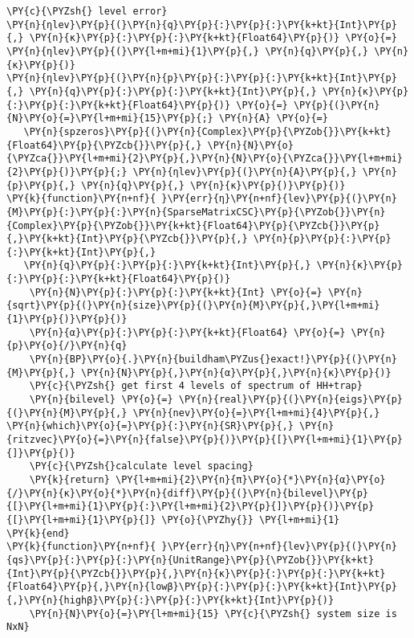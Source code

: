\begin{Verbatim}[commandchars=\\\{\}]
\PY{c}{\PYZsh{} level error}
\PY{n}{ηlev}\PY{p}{(}\PY{n}{q}\PY{p}{:}\PY{p}{:}\PY{k+kt}{Int}\PY{p}{,} \PY{n}{κ}\PY{p}{:}\PY{p}{:}\PY{k+kt}{Float64}\PY{p}{)} \PY{o}{=} \PY{n}{ηlev}\PY{p}{(}\PY{l+m+mi}{1}\PY{p}{,} \PY{n}{q}\PY{p}{,} \PY{n}{κ}\PY{p}{)}
\PY{n}{ηlev}\PY{p}{(}\PY{n}{p}\PY{p}{:}\PY{p}{:}\PY{k+kt}{Int}\PY{p}{,} \PY{n}{q}\PY{p}{:}\PY{p}{:}\PY{k+kt}{Int}\PY{p}{,} \PY{n}{κ}\PY{p}{:}\PY{p}{:}\PY{k+kt}{Float64}\PY{p}{)} \PY{o}{=} \PY{p}{(}\PY{n}{N}\PY{o}{=}\PY{l+m+mi}{15}\PY{p}{;} \PY{n}{A} \PY{o}{=}
   \PY{n}{spzeros}\PY{p}{(}\PY{n}{Complex}\PY{p}{\PYZob{}}\PY{k+kt}{Float64}\PY{p}{\PYZcb{}}\PY{p}{,} \PY{n}{N}\PY{o}{\PYZca{}}\PY{l+m+mi}{2}\PY{p}{,}\PY{n}{N}\PY{o}{\PYZca{}}\PY{l+m+mi}{2}\PY{p}{)}\PY{p}{;} \PY{n}{ηlev}\PY{p}{(}\PY{n}{A}\PY{p}{,} \PY{n}{p}\PY{p}{,} \PY{n}{q}\PY{p}{,} \PY{n}{κ}\PY{p}{)}\PY{p}{)}
\PY{k}{function}\PY{n+nf}{ }\PY{err}{η}\PY{n+nf}{lev}\PY{p}{(}\PY{n}{M}\PY{p}{:}\PY{p}{:}\PY{n}{SparseMatrixCSC}\PY{p}{\PYZob{}}\PY{n}{Complex}\PY{p}{\PYZob{}}\PY{k+kt}{Float64}\PY{p}{\PYZcb{}}\PY{p}{,}\PY{k+kt}{Int}\PY{p}{\PYZcb{}}\PY{p}{,} \PY{n}{p}\PY{p}{:}\PY{p}{:}\PY{k+kt}{Int}\PY{p}{,}
   \PY{n}{q}\PY{p}{:}\PY{p}{:}\PY{k+kt}{Int}\PY{p}{,} \PY{n}{κ}\PY{p}{:}\PY{p}{:}\PY{k+kt}{Float64}\PY{p}{)}
    \PY{n}{N}\PY{p}{:}\PY{p}{:}\PY{k+kt}{Int} \PY{o}{=} \PY{n}{sqrt}\PY{p}{(}\PY{n}{size}\PY{p}{(}\PY{n}{M}\PY{p}{,}\PY{l+m+mi}{1}\PY{p}{)}\PY{p}{)}
    \PY{n}{α}\PY{p}{:}\PY{p}{:}\PY{k+kt}{Float64} \PY{o}{=} \PY{n}{p}\PY{o}{/}\PY{n}{q}
    \PY{n}{BP}\PY{o}{.}\PY{n}{buildham\PYZus{}exact!}\PY{p}{(}\PY{n}{M}\PY{p}{,} \PY{n}{N}\PY{p}{,}\PY{n}{α}\PY{p}{,}\PY{n}{κ}\PY{p}{)}
    \PY{c}{\PYZsh{} get first 4 levels of spectrum of HH+trap}
    \PY{n}{bilevel} \PY{o}{=} \PY{n}{real}\PY{p}{(}\PY{n}{eigs}\PY{p}{(}\PY{n}{M}\PY{p}{,} \PY{n}{nev}\PY{o}{=}\PY{l+m+mi}{4}\PY{p}{,} \PY{n}{which}\PY{o}{=}\PY{p}{:}\PY{n}{SR}\PY{p}{,} \PY{n}{ritzvec}\PY{o}{=}\PY{n}{false}\PY{p}{)}\PY{p}{[}\PY{l+m+mi}{1}\PY{p}{]}\PY{p}{)}
    \PY{c}{\PYZsh{}calculate level spacing}
    \PY{k}{return} \PY{l+m+mi}{2}\PY{n}{π}\PY{o}{*}\PY{n}{α}\PY{o}{/}\PY{n}{κ}\PY{o}{*}\PY{n}{diff}\PY{p}{(}\PY{n}{bilevel}\PY{p}{[}\PY{l+m+mi}{1}\PY{p}{:}\PY{l+m+mi}{2}\PY{p}{]}\PY{p}{)}\PY{p}{[}\PY{l+m+mi}{1}\PY{p}{]} \PY{o}{\PYZhy{}} \PY{l+m+mi}{1}
\PY{k}{end}
\PY{k}{function}\PY{n+nf}{ }\PY{err}{η}\PY{n+nf}{lev}\PY{p}{(}\PY{n}{qs}\PY{p}{:}\PY{p}{:}\PY{n}{UnitRange}\PY{p}{\PYZob{}}\PY{k+kt}{Int}\PY{p}{\PYZcb{}}\PY{p}{,}\PY{n}{κ}\PY{p}{:}\PY{p}{:}\PY{k+kt}{Float64}\PY{p}{,}\PY{n}{lowβ}\PY{p}{:}\PY{p}{:}\PY{k+kt}{Int}\PY{p}{,}\PY{n}{highβ}\PY{p}{:}\PY{p}{:}\PY{k+kt}{Int}\PY{p}{)}
    \PY{n}{N}\PY{o}{=}\PY{l+m+mi}{15} \PY{c}{\PYZsh{} system size is NxN}

\end{Verbatim}
